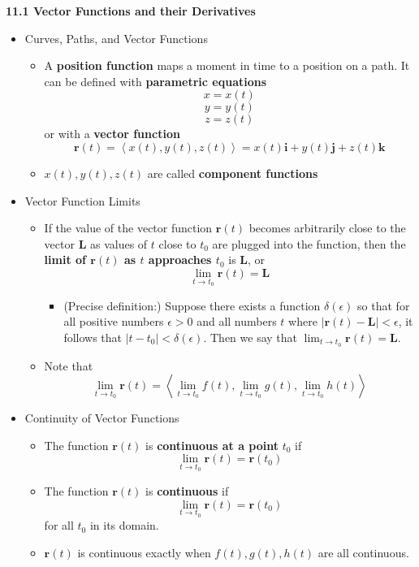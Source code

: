 \documentclass[12pt]{article}
\renewcommand{\vec}[1]{\mathbf{#1}}
\newcommand{\veci}{\mathbf{i}}
\newcommand{\vecj}{\mathbf{j}}
\newcommand{\veck}{\mathbf{k}}
\newcommand{\<}{\left<}
\renewcommand{\>}{\right>}
\begin{document}
\newpage
  
  \centerline{\bf 11.1 Vector Functions and their Derivatives}
  
  \begin{itemize}
    \item Curves, Paths, and Vector Functions
      \begin{itemize}
        \item A \textbf{position function} maps a moment in time to a position on a path. It can be defined with \textbf{parametric equations} \[x=x(t)\] \[y=y(t)\] \[z=z(t)\] or with a \textbf{vector function} \[\vec{r}(t) = \<x(t),y(t),z(t)\> = x(t)\veci + y(t)\vecj + z(t)\veck\]
        \item $x(t),y(t),z(t)$ are called \textbf{component functions}
      \end{itemize}

    \item Vector Function Limits
      \begin{itemize}
      \item If the value of the vector function $\vec{r}(t)$ becomes arbitrarily close to the vector $\vec{L}$ as values of $t$ close to $t_0$ are plugged into the function, then the \textbf{limit of $\vec{r}(t)$ as $t$ approaches $t_0$} is $\vec{L}$, or \[\lim_{t\to t_0} \vec{r}(t) = \vec{L}\]
        \begin{itemize}
        \item (Precise definition:) Suppose there exists a function $\delta(\epsilon)$ so that for all positive numbers $\epsilon>0$ and all numbers $t$ where $|\vec{r}(t)-\vec{L}|<\epsilon$, it follows that $|t-t_0|<\delta(\epsilon)$. Then we say that $\lim_{t\to t_0} \vec{r}(t) = \vec{L}$.
        \end{itemize}
      \item Note that \[\lim_{t\to t_0} \vec{r}(t) = \<\lim_{t\to t_0} f(t), \lim_{t\to t_0} g(t), \lim_{t\to t_0} h(t)\>\]
      \end{itemize}

    \item Continuity of Vector Functions
      \begin{itemize}
        \item The function $\vec{r}(t)$ is \textbf{continuous at a point} $t_0$ if \[\lim_{t\to t_0}\vec{r}(t) = \vec{r}(t_0)\]
        \item
        The function $\vec{r}(t)$ is \textbf{continuous} if \[\lim_{t\to t_0}\vec{r}(t) = \vec{r}(t_0)\] for all $t_0$ in its domain.
        \item $\vec{r}(t)$ is continuous exactly when $f(t),g(t),h(t)$ are all continuous.
      \end{itemize}


\end{itemize}
\end{document}

